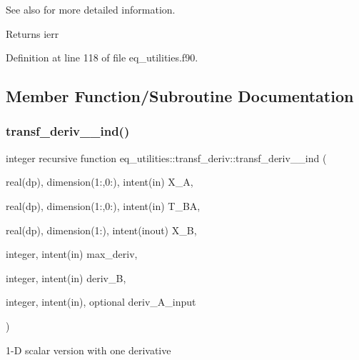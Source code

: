 \begin{DoxySeeAlso}{See also}
\cite{Weyens3D} for more detailed information.
\end{DoxySeeAlso}
\begin{DoxyReturn}{Returns}
ierr 
\end{DoxyReturn}


Definition at line 118 of file eq\+\_\+utilities.\+f90.



\subsection{Member Function/\+Subroutine Documentation}
\mbox{\label{interfaceeq__utilities_1_1transf__deriv_ae0caaaa6fbd6d68f926921b7565ca727}} 
\subsubsection{\texorpdfstring{transf\+\_\+deriv\+\_\+\_\+ind()}{transf\_deriv\_1\_ind()}}
{\footnotesize\ttfamily integer recursive function eq\+\_\+utilities\+::transf\+\_\+deriv\+::transf\+\_\+deriv\+\_\+\_\+ind (\begin{DoxyParamCaption}\item[{real(dp), dimension(1\+:,0\+:), intent(in)}]{X\+\_\+A,  }\item[{real(dp), dimension(1\+:,0\+:), intent(in)}]{T\+\_\+\+BA,  }\item[{real(dp), dimension(1\+:), intent(inout)}]{X\+\_\+B,  }\item[{integer, intent(in)}]{max\+\_\+deriv,  }\item[{integer, intent(in)}]{deriv\+\_\+B,  }\item[{integer, intent(in), optional}]{deriv\+\_\+\+A\+\_\+input }\end{DoxyParamCaption})}



1-\/D scalar version with one derivative 


